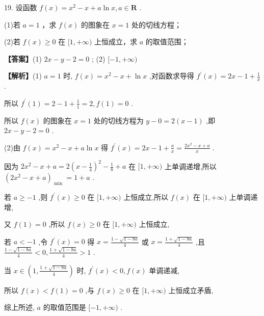 \documentclass[10pt]{article}
\begin{document}
19. 设函数 \(f\left( x\right)  = {x}^{2} - x + a\ln x,a \in  \mathbf{R}\) .

(1)若 \(a = 1\) ，求 \(f\left( x\right)\) 的图象在 \(x = 1\) 处的切线方程；

(2)若 \(f\left( x\right)  \geq  0\) 在 \(\lbrack 1, + \infty )\) 上恒成立，求 \(a\) 的取值范围；

\textbf{【答案】}(1) \({2x} - y - 2 = 0\) ; (2) \(\lbrack  - 1, + \infty )\)

\textbf{【解析】}(1) \(a = 1\) 时, \(f\left( x\right)  = {x}^{2} - x + \ln x\) ,对函数求导得 \({f}^{\prime }\left( x\right)  = {2x} - 1 + \frac{1}{x}\) .

所以 \({f}^{\prime }\left( 1\right)  = 2 - 1 + \frac{1}{1} = 2,f\left( 1\right)  = 0\) .

所以 \(f\left( x\right)\) 的图象在 \(x = 1\) 处的切线方程为 \(y - 0 = 2\left( {x - 1}\right)\) ,即 \({2x} - y - 2 = 0\) .

(2)由 \(f\left( x\right)  = {x}^{2} - x + a\ln x\) 得 \({f}^{\prime }\left( x\right)  = {2x} - 1 + \frac{a}{x} = \frac{2{x}^{2} - x + a}{x}\) .

因为 \(2{x}^{2} - x + a = 2{\left( x - \frac{1}{4}\right) }^{2} - \frac{1}{8} + a\) 在 \(\lbrack 1, + \infty )\) 上单调递增,所以 \({\left( 2{x}^{2} - x + a\right) }_{\text{ min }} = 1 + a\) .

若 \(a \geq   - 1\) ,则 \({f}^{\prime }\left( x\right)  \geq  0\) 在 \(\lbrack 1, + \infty )\) 上恒成立,所以 \(f\left( x\right)\) 在 \(\lbrack 1, + \infty )\) 上单调递增,

又 \(f\left( 1\right)  = 0\) ,所以 \(f\left( x\right)  \geq  0\) 在 \(\lbrack 1, + \infty )\) 上恒成立,

若 \(a <  - 1\) ,令 \({f}^{\prime }\left( x\right)  = 0\) 得 \(x = \frac{1 - \sqrt{1 - {8a}}}{4}\) 或 \(x = \frac{1 + \sqrt{1 - {8a}}}{4}\) ,且 \(\frac{1 - \sqrt{1 - {8a}}}{4} < 0,\frac{1 + \sqrt{1 - {8a}}}{4} > 1\) .

当 \(x \in  \left( {1,\frac{1 + \sqrt{1 - {8a}}}{4}}\right)\) 时, \({f}^{\prime }\left( x\right)  < 0,f\left( x\right)\) 单调递减,

所以 \(f\left( x\right)  < f\left( 1\right)  = 0\) ,与 \(f\left( x\right)  \geq  0\) 在 \(\lbrack 1, + \infty )\) 上恒成立矛盾,

综上所述, \(a\) 的取值范围是 \(\lbrack  - 1, + \infty )\) .
\end{document}
